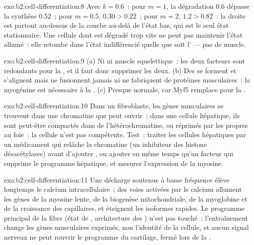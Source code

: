 \begin{solution}{exo:b2:cell-differentiation:8}
Avec $k = 0.6$~: pour $m = 1$, la dégradation $0.6$ dépasse la synthèse
$0.52$~; pour $m = 0.5$, $0.30 > 0.22$~; pour $m = 2$, $1.2 > 0.82$~: la
droite est partout au-dessus de la courbe au-delà de l'état bas, qui est
le seul état stationnaire. Une cellule dont  est dégradé trop vite ne
peut pas maintenir l'état allumé~: elle retombe dans l'état
indifférencié quelle que soit l' --- pas de muscle.
\end{solution}

\begin{solution}{exo:b2:cell-differentiation:9}
(a) Ni  ni muscle squelettique~: les deux facteurs sont
redondants pour la , et il faut donc supprimer les deux.
(b) Des  se forment et s'alignent mais ne fusionnent jamais ni
ne fabriquent de protéines musculaires~: la myogénine est nécessaire à la
. (c) Presque normale, car Myf5 remplace  pour la
.
\end{solution}

\begin{solution}{exo:b2:cell-differentiation:10}
Dans un fibroblaste, les gènes musculaires se trouvent dans une
chromatine que  peut ouvrir~; dans une cellule hépatique, ils sont
peut-être compactés dans de l'hétérochromatine, ou réprimés par les
 propres au foie~: la cellule n'est pas compétente.
Test~: traiter les cellules hépatiques par un médicament qui relâche la
chromatine (un inhibiteur des histone désacétylases) avant d'ajouter
, ou ajouter  en même temps qu'un facteur qui supprime le
programme hépatique, et mesurer l'expression de la myosine.
\end{solution}

\begin{solution}{exo:b2:cell-differentiation:11}
Une décharge soutenue à basse fréquence élève longtemps le calcium
intracellulaire~; des voies activées par le calcium allument les gènes
de la myosine lente, de la biogenèse mitochondriale, de la myoglobine et
de la croissance des capillaires, et éteignent les isoformes rapides. Le
programme principal de la fibre (état de , architecture des
) n'est pas touché~: l'entraînement change les gènes
musculaires exprimés, non l'identité de la cellule, et aucun signal
nerveux ne peut rouvrir le programme du cartilage, fermé lors de la
.
\end{solution}

